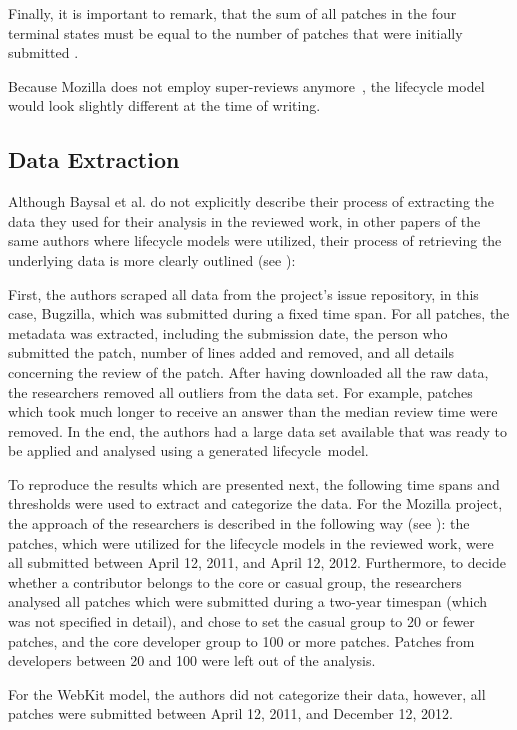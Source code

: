 \documentclass[conference]{IEEEtran}
\begin{document}
Finally, it is important to remark, that the sum of all patches in the four terminal states must be equal to the number of patches that were initially submitted \cite{baysal2015synthesizing}.

Because Mozilla does not employ super-reviews anymore~\cite{mozilla_super_review}, the lifecycle model would look slightly different at the time of writing.

\subsection{Data Extraction}

Although Baysal et al. do not explicitly describe their process of extracting the data they used for their analysis in the reviewed work, in other papers of the same authors where lifecycle models were utilized, their process of retrieving the underlying data is more clearly outlined (see \cite{baysal2013influence}):

First, the authors scraped all data from the project's issue repository, in this case, Bugzilla, which was submitted during a fixed time span. For all patches, the metadata was extracted, including the submission date, the person who submitted the patch, number of lines added and removed, and all details concerning the review of the patch. After having downloaded all the raw data, the researchers removed all outliers from the data set. For example, patches which took much longer to receive an answer than the median review time were removed. In the end, the authors had a large data set available that was ready to be applied and analysed using a generated lifecycle~model.

To reproduce the results which are presented next, the following time spans and thresholds were used to extract and categorize the data. For the Mozilla project, the approach of the researchers is described in the following way (see \cite{baysal2012secret}): the patches, which were utilized for the lifecycle models in the reviewed work, were all submitted between April 12, 2011, and April 12, 2012. Furthermore, to decide whether a contributor belongs to the core or casual group, the researchers analysed all patches which were submitted during a two-year timespan (which was not specified in detail), and chose to set the casual group to 20 or fewer patches, and the core developer group to 100 or more patches. Patches from developers between 20 and 100 were left out of the analysis.

For the WebKit model, the authors did not categorize their data, however, all patches were submitted between April 12, 2011, and December 12, 2012\cite{baysal2013influence}.
\end{document}
